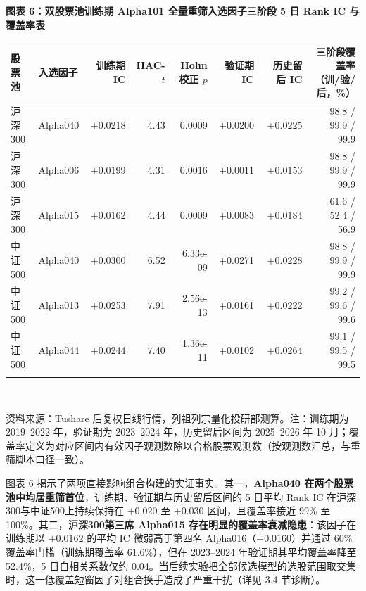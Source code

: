 \documentclass[12pt,a4paper]{article}
\newcommand{\exhibitcap}[1]{{\sffamily\bfseries\fontsize{9.6pt}{12.5pt}\selectfont\textcolor{Primary}{#1}}\\[2pt]}
\newcommand{\exhibitnote}[1]{{\fontsize{7.5pt}{10pt}\selectfont\color{GrayNote}#1\par}}
\begin{document}
\vspace{4pt}
\noindent\begin{minipage}{\textwidth}
\setlength{\parindent}{0pt}\setlength{\tabcolsep}{3.8pt}
\exhibitcap{图表 6：双股票池训练期 Alpha101 全量重筛入选因子三阶段 5 日 Rank IC 与覆盖率表}
\fontsize{7.8pt}{10.6pt}\selectfont
\begin{tabularx}{\textwidth}{@{}l X r r r r r r@{}}
  \arrayrulecolor{Primary}\toprule[1.0pt]
  \rowcolor{TblHdr}
  \textbf{\sffamily 股票池} & \textbf{\sffamily 入选因子} & \textbf{\sffamily 训练期 IC} & \textbf{\sffamily HAC-$t$} & \textbf{\sffamily Holm 校正 $p$} & \textbf{\sffamily 验证期 IC} & \textbf{\sffamily 历史留后 IC} & \textbf{\sffamily 三阶段覆盖率（训/验/后，\%）} \\
  \midrule[0.5pt]
    沪深300 & Alpha040 & +0.0218 & 4.43 & 0.0009 & +0.0200 & +0.0225 & 98.8 / 99.9 / 99.9 \\
    沪深300 & Alpha006 & +0.0199 & 4.31 & 0.0016 & +0.0011 & +0.0153 & 98.8 / 99.9 / 99.9 \\
    沪深300 & Alpha015 & +0.0162 & 4.44 & 0.0009 & +0.0083 & +0.0184 & 61.6 / 52.4 / 56.9 \\
    \arrayrulecolor{RuleMuted}\midrule[0.35pt]
    中证500 & Alpha040 & +0.0300 & 6.52 & 6.33e-09 & +0.0271 & +0.0228 & 98.8 / 99.9 / 99.9 \\
    中证500 & Alpha013 & +0.0253 & 7.91 & 2.56e-13 & +0.0161 & +0.0222 & 99.2 / 99.6 / 99.6 \\
    中证500 & Alpha044 & +0.0244 & 7.40 & 1.36e-11 & +0.0102 & +0.0264 & 99.1 / 99.5 / 99.5 \\
  \arrayrulecolor{Primary}\bottomrule[1.0pt]
\end{tabularx}\\[3pt]
\exhibitnote{资料来源：Tushare 后复权日线行情，列祖列宗量化投研部测算。注：训练期为 2019–2022 年，验证期为 2023–2024 年，历史留后区间为 2025–2026 年 10 月；覆盖率定义为对应区间内有效因子观测数除以合格股票观测数（按观测数汇总，与重筛脚本口径一致）。}
\end{minipage}
\vspace{5pt}

图表 6 揭示了两项直接影响组合构建的实证事实。其一，\textbf{Alpha040 在两个股票池中均居重筛首位}，训练期、验证期与历史留后区间的 5 日平均 Rank IC 在沪深300与中证500上持续保持在 $+0.020$ 至 $+0.030$ 区间，且覆盖率接近 99\% 至 100\%。其二，\textbf{沪深300第三席 Alpha015 存在明显的覆盖率衰减隐患}：该因子在训练期以 $+0.0162$ 的平均 IC 微弱高于第四名 Alpha016（$+0.0160$）并通过 60\% 覆盖率门槛（训练期覆盖率 61.6\%），但在 2023–2024 年验证期其平均覆盖率降至 52.4\%，5 日自相关系数仅约 0.04。当后续实验把全部候选模型的选股范围取交集时，这一低覆盖短窗因子对组合换手造成了严重干扰（详见 3.4 节诊断）。
\end{document}
